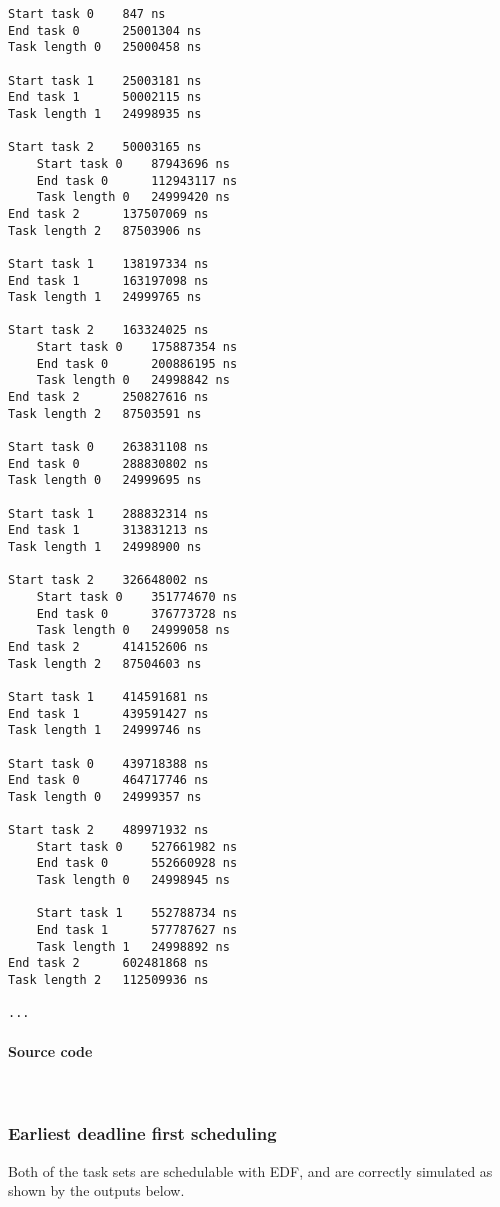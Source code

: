 \begin{lstlisting}[keywordstyle=\color{black}, caption={Output (reformatted) RM 2\textsuperscript{nd} set}]
Start task 0	847 ns
End task 0		25001304 ns
Task length 0	25000458 ns

Start task 1	25003181 ns
End task 1		50002115 ns
Task length 1	24998935 ns

Start task 2	50003165 ns
	Start task 0	87943696 ns
	End task 0		112943117 ns
	Task length 0	24999420 ns
End task 2		137507069 ns
Task length 2	87503906 ns

Start task 1	138197334 ns
End task 1		163197098 ns
Task length 1	24999765 ns

Start task 2	163324025 ns
	Start task 0	175887354 ns
	End task 0		200886195 ns
	Task length 0	24998842 ns
End task 2		250827616 ns
Task length 2	87503591 ns

Start task 0	263831108 ns
End task 0		288830802 ns
Task length 0	24999695 ns

Start task 1	288832314 ns
End task 1		313831213 ns
Task length 1	24998900 ns

Start task 2	326648002 ns
	Start task 0	351774670 ns
	End task 0		376773728 ns
	Task length 0	24999058 ns
End task 2		414152606 ns
Task length 2	87504603 ns

Start task 1	414591681 ns
End task 1		439591427 ns
Task length 1	24999746 ns

Start task 0	439718388 ns
End task 0		464717746 ns
Task length 0	24999357 ns

Start task 2	489971932 ns
	Start task 0	527661982 ns
	End task 0		552660928 ns
	Task length 0	24998945 ns

	Start task 1	552788734 ns
	End task 1		577787627 ns
	Task length 1	24998892 ns
End task 2		602481868 ns
Task length 2	112509936 ns

...
\end{lstlisting}

\paragraph{Source code}
\



\subsubsection{Earliest deadline first scheduling}
Both of the task sets are schedulable with EDF, and are correctly simulated as shown by the outputs below.\\

